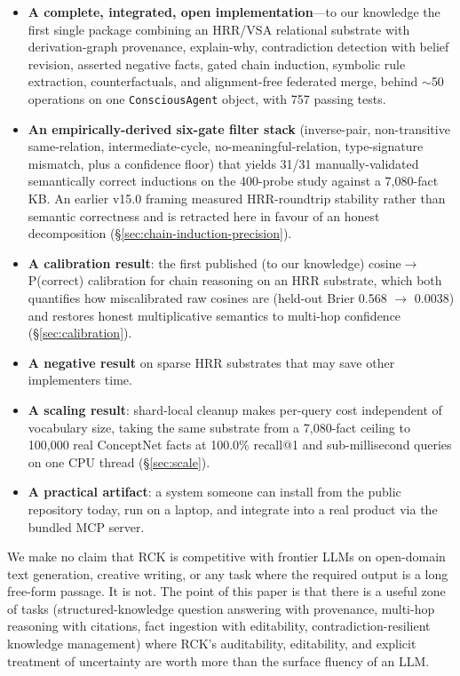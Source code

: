 \documentclass[11pt]{article}
\begin{document}
\begin{itemize}
\item \textbf{A complete, integrated, open implementation}---to our
      knowledge the first single package combining an HRR/VSA
      relational substrate with derivation-graph provenance,
      explain-why, contradiction detection with belief revision,
      asserted negative facts, gated chain induction, symbolic rule
      extraction, counterfactuals, and alignment-free federated
      merge, behind $\sim$50 operations on one
      \texttt{ConsciousAgent} object, with 757 passing tests.
\item \textbf{An empirically-derived six-gate filter stack}
      (inverse-pair, non-transitive same-relation, intermediate-cycle,
      no-meaningful-relation, type-signature mismatch, plus a
      confidence floor) that yields 31/31 manually-validated
      semantically correct inductions on the 400-probe study against
      a 7{,}080-fact KB. An earlier v15.0 framing measured
      HRR-roundtrip stability rather than semantic correctness and is
      retracted here in favour of an honest decomposition
      (\S\ref{sec:chain-induction-precision}).
\item \textbf{A calibration result}: the first published (to our
      knowledge) cosine$\to$P(correct) calibration for chain
      reasoning on an HRR substrate, which both quantifies how
      miscalibrated raw cosines are (held-out Brier 0.568 $\to$
      0.0038) and restores honest multiplicative semantics to
      multi-hop confidence (\S\ref{sec:calibration}).
\item \textbf{A negative result} on sparse HRR substrates that may
      save other implementers time.
\item \textbf{A scaling result}: shard-local cleanup makes per-query
      cost independent of vocabulary size, taking the same substrate
      from a 7{,}080-fact ceiling to 100{,}000 real ConceptNet facts
      at 100.0\% recall@1 and sub-millisecond queries on one CPU
      thread (\S\ref{sec:scale}).
\item \textbf{A practical artifact}: a system someone can install
      from the public repository today, run on a laptop, and
      integrate into a real product via the bundled MCP server.
\end{itemize}

We make no claim that RCK is competitive with frontier LLMs on
open-domain text generation, creative writing, or any task where the
required output is a long free-form passage. It is not. The point
of this paper is that there is a useful zone of tasks
(structured-knowledge question answering with provenance, multi-hop
reasoning with citations, fact ingestion with editability,
contradiction-resilient knowledge management) where RCK's
auditability, editability, and explicit treatment of uncertainty
are worth more than the surface fluency of an LLM.
\end{document}
